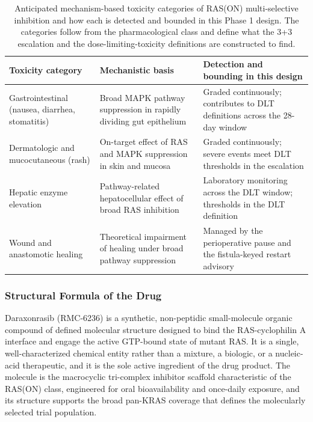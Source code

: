 \begin{table}[t]
\caption{Anticipated mechanism-based toxicity categories of RAS(ON) multi-selective
inhibition and how each is detected and bounded in this Phase 1 design. The
categories follow from the pharmacological class and define what the 3+3 escalation
and the dose-limiting-toxicity definitions are constructed to find.}
\label{tab:sec02-toxcat}
\centering
\begin{tabularx}{\textwidth}{L{3.6cm} Y Y}
\toprule
\textbf{Toxicity category} & \textbf{Mechanistic basis} & \textbf{Detection and bounding in this design} \\
\midrule
Gastrointestinal (nausea, diarrhea, stomatitis) & Broad MAPK pathway suppression in rapidly dividing gut epithelium & Graded continuously; contributes to DLT definitions across the 28-day window \\
Dermatologic and mucocutaneous (rash) & On-target effect of RAS and MAPK suppression in skin and mucosa & Graded continuously; severe events meet DLT thresholds in the escalation \\
Hepatic enzyme elevation & Pathway-related hepatocellular effect of broad RAS inhibition & Laboratory monitoring across the DLT window; thresholds in the DLT definition \\
Wound and anastomotic healing & Theoretical impairment of healing under broad pathway suppression & Managed by the perioperative pause and the fistula-keyed restart advisory \\
\bottomrule
\end{tabularx}
\end{table}


\subsubsection{Structural Formula of the Drug}

Daraxonrasib (RMC-6236) is a synthetic, non-peptidic small-molecule organic
compound of defined molecular structure designed to bind the RAS-cyclophilin A
interface and engage the active GTP-bound state of mutant RAS. It is a single,
well-characterized chemical entity rather than a mixture, a biologic, or a
nucleic-acid therapeutic, and it is the sole active ingredient of the drug product.
The molecule is the macrocyclic tri-complex inhibitor scaffold characteristic of
the RAS(ON) class, engineered for oral bioavailability and once-daily exposure, and
its structure supports the broad pan-KRAS coverage that defines the molecularly
selected trial population.

